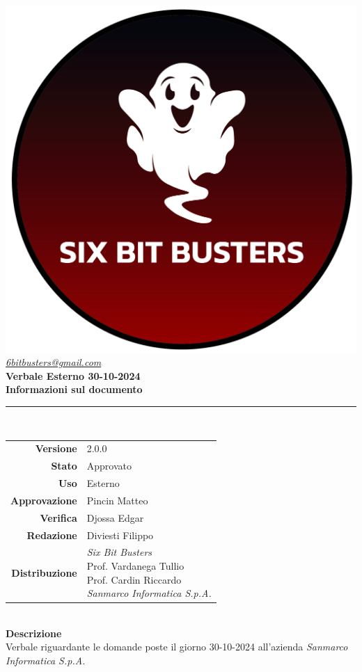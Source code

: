 \thispagestyle{empty}
\renewcommand{\arraystretch}{1.3}


\begin{titlepage}
	\begin{center}
		
	\includegraphics[scale = 0.7]{template/images/logo-circle.png}
	\\[1cm]
	\href{mailto:6bitbusters@gmail.com}		      	
	{\large{\textit{6bitbusters@gmail.com} } }\\[1cm]
	
	\Huge \textbf{Verbale Esterno 30-10-2024} \\[1cm]

	\large \textbf{Informazioni sul documento} \\
	\rule{0.6\textwidth}{0.4pt}
	\\[0.5cm]
	\begin{tabular}{r|l}
		\textbf{Versione} & 2.0.0\\
		\textbf{Stato} & Approvato\\
		\textbf{Uso} & Esterno\\                         
		\textbf{Approvazione} & Pincin Matteo\\                      
		\textbf{Verifica} & Djossa Edgar\\                         
		\textbf{Redazione} & Diviesti Filippo\\ 
		\textbf{Distribuzione} & \parbox[t]{6cm}{ \textit{Six Bit Busters} \\ Prof. Vardanega Tullio 
	 \\ Prof. Cardin Riccardo \\ \textit{Sanmarco Informatica S.p.A.}}
	\end{tabular}	
	\\[1.2cm]

	\large \textbf{Descrizione} \\
	Verbale riguardante le domande poste il giorno 30-10-2024 all'azienda \textit{Sanmarco Informatica S.p.A.}
	
	\end{center}
\end{titlepage}
